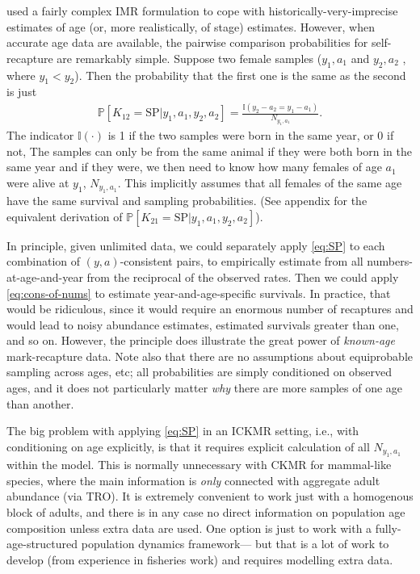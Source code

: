 \citet{beatty_estimating_2022} used a fairly complex IMR formulation
to cope with historically-very-imprecise estimates of age (or, more
realistically, of \textquotedbl stage\textquotedbl ) estimates.
However, when accurate age data are available, the pairwise comparison
probabilities for self-recapture are remarkably simple. Suppose two
female samples ($y_{1},a_{1}$ and $y_{2},a_{2}$ , where $y_{1}<y_{2}$).
Then the probability that the first one is the same as the second
is just
\begin{gather}
\mathbb{P}\left[K_{12}=\text{SP}\vert y_{1},a_{1},y_{2},a_{2}\right]=\frac{\mathbb{I}\left(y_{2}-a_{2}=y_{1}-a_{1}\right)}{N_{y_{1},a_{1}}}.\label{eq:SP}
\end{gather}
The indicator $\mathbb{I}\left(\cdot\right)$ is 1 if the two samples
were born in the same year, or 0 if not, The samples can only be from
the same animal if they were both born in the same year and if they
were, we then need to know how many females of age $a_{1}$ were alive
at $y_{1}$, $N_{y_{1},a_{1}}$. This implicitly assumes that all
females of the same age have the same survival and sampling probabilities.
(See appendix for the equivalent derivation of $\mathbb{P}\left[K_{21}=\text{SP}\vert y_{1},a_{1},y_{2},a_{2}\right]$).

In principle, given unlimited data, we could separately apply \eqref{eq:SP}
to each combination of $\left(y,a\right)$-consistent pairs, to empirically
estimate from all numbers-at-age-and-year from the reciprocal of the
observed rates. Then we could apply \eqref{eq:cons-of-nums} to estimate
year-and-age-specific survivals. In practice, that would be ridiculous,
since it would require an enormous number of recaptures and would
lead to noisy abundance estimates, estimated survivals greater than
one, and so on. However, the principle does illustrate the great power
of \emph{known-age} mark-recapture data. Note also that there are
no assumptions about equiprobable sampling across ages, etc; all probabilities
are simply conditioned on observed ages, and it does not particularly
matter \emph{why} there are more samples of one age than another.

The big problem with applying \eqref{eq:SP} in an ICKMR setting,
i.e., with conditioning on age explicitly, is that it requires explicit
calculation of all $N_{y_{1},a_{1}}$ within the model. This is normally
unnecessary with CKMR for mammal-like species, where the main information
is \emph{only} connected with aggregate adult abundance (via TRO).
It is extremely convenient to work just with a \textquotedbl homogenous
block\textquotedbl{} of adults, and there is in any case no direct
information on population age composition unless extra data are used.
One option is \textquotedbl just\textquotedbl{} to work with a fully-age-structured
population dynamics framework— but that is a lot of work to develop
(from experience in fisheries work) and requires modelling extra data.\pagebreak{}


